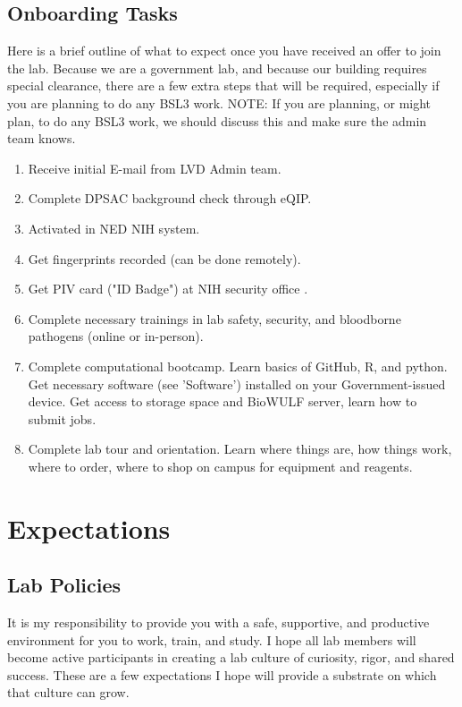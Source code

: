 \documentclass[10pt, letterpaper, twocolumn]{article} %
\begin{document}
\subsection{Onboarding Tasks}
Here is a brief outline of what to expect once you have received an offer to join the lab. Because we are a government lab, and because our building requires special clearance, there are a few extra steps that will be required, especially if you are planning to do any BSL3 work.
NOTE: If you are planning, or might plan, to do any BSL3 work, we should discuss this and make sure the admin team knows.
\begin{enumerate}
\item Receive initial E-mail from LVD Admin team.
\item Complete DPSAC background check through eQIP.
\item Activated in NED NIH system.
\item Get fingerprints recorded (can be done remotely).
\item Get PIV card ("ID Badge") at NIH security office .
\item Complete necessary trainings in lab safety, security, and bloodborne pathogens (online or in-person).
\item Complete computational bootcamp. Learn basics of GitHub, R, and python. Get necessary software (see 'Software') installed on your Government-issued device. Get access to storage space and BioWULF server, learn how to submit jobs.
\item Complete lab tour and orientation.	Learn where things are, how things work, where to order, where to shop on campus for equipment and reagents.
\end{enumerate}

\section{Expectations}
\subsection{Lab Policies}
It is my responsibility to provide you with a safe, supportive, and productive environment for you to work, train, and study. I hope all lab members will become active participants in creating a lab culture of curiosity, rigor, and shared success. These are a few expectations I hope will provide a substrate on which that culture can grow.
\end{document}
